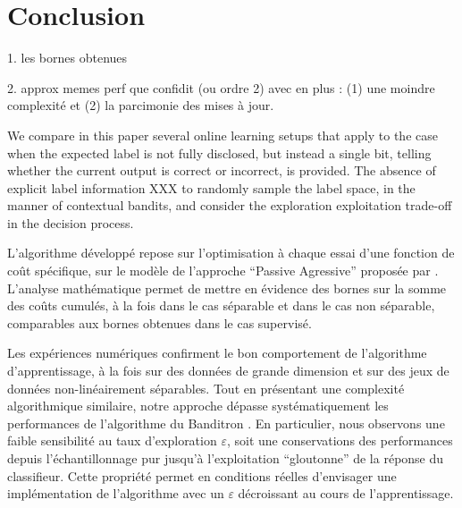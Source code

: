 \documentclass[preprint,12pt,authoryear]{elsarticle}
\begin{document}
\section{Conclusion}
\label{sec:conclusion}

{\color{green}


1. les bornes obtenues

2. approx memes perf que confidit (ou ordre 2) avec en plus : (1) une moindre complexité et (2) la parcimonie des mises à jour. }

We compare in this paper several online learning setups that apply to the case  when the expected label is not fully disclosed, but instead a single bit, telling whether the current output is correct or incorrect, is provided. The  absence of explicit label information XXX to randomly sample the label space, in the manner of contextual bandits, and consider the exploration exploitation trade-off in the decision process. 


L'algorithme développé repose  sur l'optimisation à chaque essai d'une fonction de coût spécifique, sur le modèle de l'approche ``Passive Agressive'' proposée par \cite{crammer2006online}. 
L'analyse mathématique permet de mettre en évidence des bornes sur la somme des coûts cumulés, à la fois dans le cas séparable et dans le cas non séparable, comparables aux bornes obtenues dans le cas supervisé.

Les expériences numériques confirment le bon comportement de l'algorithme d'apprentissage, à la fois sur des données de grande dimension et sur des jeux de données non-linéairement séparables. Tout en présentant une complexité algorithmique similaire, notre approche dépasse systématiquement les performances de l'algorithme du Banditron \cite{kakade2008efficient}. En particulier, nous observons une faible sensibilité au taux d'exploration $\varepsilon$, soit une conservations des performances depuis l'échantillonnage pur jusqu'à l'exploitation ``gloutonne'' de la réponse du classifieur. Cette propriété permet en conditions réelles d'envisager une implémentation de l'algorithme avec un $\varepsilon$ décroissant au cours de l'apprentissage.    
\end{document}
